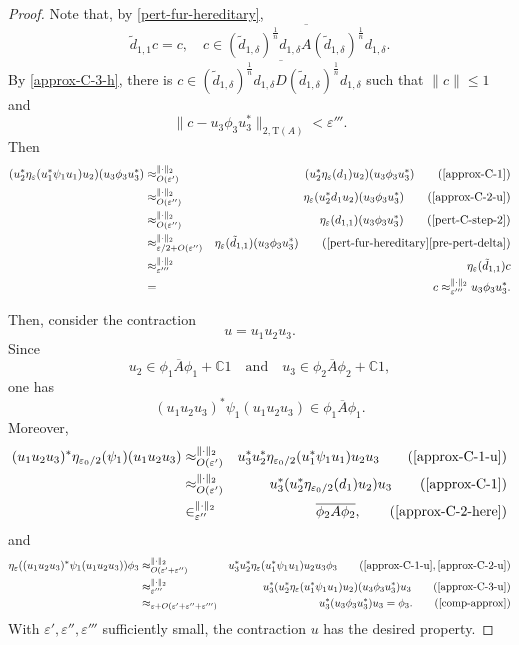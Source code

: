 \documentclass[10pt,a4paper]{amsart}
\newcommand{\Comp}{\mathbb C}
\newcommand{\eps}{\varepsilon}
\newcommand{\norm}[1]{\| #1\|}
\newcommand{\tr}{\mathrm{T}}
\begin{document}
\begin{proof}
Note that, by \eqref{pert-fur-hereditary},
$$\tilde{d}_{1, 1}c = c,\quad c \in \overline{(\tilde{d}_{1, \delta})^{\frac{1}{n}} d_{1, \delta} A (\tilde{d}_{1, \delta})^{\frac{1}{n}} d_{1, \delta} }.$$
By \eqref{approx-C-3-h}, there is $c \in \overline{(\tilde{d}_{1, \delta})^{\frac{1}{n}} d_{1, \delta}D (\tilde{d}_{1, \delta})^{\frac{1}{n}} d_{1, \delta}}$ such that $\norm{c} \leq 1$ and
$$ \norm{c - u_3\phi_3 u_3^*}_{2, \tr(A)} < \eps'''.$$ 
Then 
\begin{eqnarray}\label{comp-approx}
 ( u^*_2\eta_{\eps}(u_1^* \psi_1 u_1)u_2) (u_3 \phi_3 u_3^*) & \approx_{O(\eps')}^{\norm{\cdot}_2} &  ( u^*_2\eta_{\eps}(d_1)u_2) (u_3 \phi_3 u_3^*) \quad\quad ( \eqref{approx-C-1} )   \\
 & \approx_{O(\eps'')}^{\norm{\cdot}_2} & \eta_{\eps}(u_2^*d_1 u_2) (u_3 \phi_3 u_3^*) \quad\quad (\eqref{approx-C-2-u})   \nonumber \\
 & \approx_{O(\eps'')}^{\norm{\cdot}_2} & \eta_{\eps}(d_{1, 1}) (u_3 \phi_3 u_3^*) \quad\quad (\eqref{pert-C-step-2})   \nonumber \\
 & \approx_{\eps/2+O(\eps'')}^{\norm{\cdot}_2} &  \eta_{\eps}(\tilde{d}_{1, 1}) (u_3 \phi_3 u_3^*) \quad \quad (\eqref{pert-fur-hereditary} \eqref{pre-pert-delta}) \nonumber \\
 & \approx_{\eps'''}^{\norm{\cdot}_2} &  \eta_{\eps}(\tilde{d}_{1, 1})  c \nonumber \\
 &=&c \approx_{\eps'''}^{\norm{\cdot}_2} u_3 \phi_3 u_3^*. \nonumber
\end{eqnarray} 


Then, consider the contraction $$ u = u_1u_2u_3.$$
Since 
$$u_2 \in \overline{\phi_1 A \phi_1}+\Comp 1\quad \mathrm{and}\quad u_3 \in \overline{\phi_2 A \phi_2} + \Comp 1, $$ one has
$$(u_1u_2u_3)^*\psi_1(u_1u_2u_3) \in \overline{\phi_1 A \phi_1}.$$
Moreover,
\begin{eqnarray*}
(u_1u_2u_3)^*\eta_{\eps_0/2}(\psi_1)(u_1u_2u_3)  & \approx_{O(\eps')}^{\norm{\cdot}_2} & u^*_3u_2^*\eta_{\eps_0/2}(u_1^*\psi_1 u_1)u_2 u_3 \quad\quad (\eqref{approx-C-1-u}) \\
& \approx_{O(\eps')}^{\norm{\cdot}_2} & u^*_3(u_2^*\eta_{\eps_0/2}(d_1)u_2) u_3 \quad\quad (\eqref{approx-C-1}) \\
& \in_{\eps''}^{\norm{\cdot}_2} & \overline{\phi_2 A \phi_2}, \quad\quad (\eqref{approx-C-2-here})
\end{eqnarray*}
and 
\begin{eqnarray*}
\eta_{\eps}((u_1u_2u_3)^*\psi_1(u_1u_2u_3)) \phi_3 & \approx_{O(\eps' + \eps'')}^{\norm{\cdot}_2} & u_3^*u_2^*\eta_\eps(u_1^*\psi_1 u_1)u_2u_3 \phi_3 \quad\quad (\eqref{approx-C-1-u}, \eqref{approx-C-2-u}) \\
 & \approx_{\eps'''}^{\norm{\cdot}_2} & u^*_3 (u^*_2  \eta_{\eps}(u_1^* \psi_1 u_1)u_2)(u_3 \phi_3 u_3^*) u_3 \quad\quad (\eqref{approx-C-3-u}) \\
 & \approx_{\eps + O(\eps'+\eps''+\eps''')} & u_3^* (u_3\phi_3 u_3^*) u_3= \phi_3. \quad\quad(\eqref{comp-approx})
 \end{eqnarray*}
With $\eps', \eps'', \eps'''$ sufficiently small, the contraction $u$ has the desired property.
\end{proof}
\end{document}

